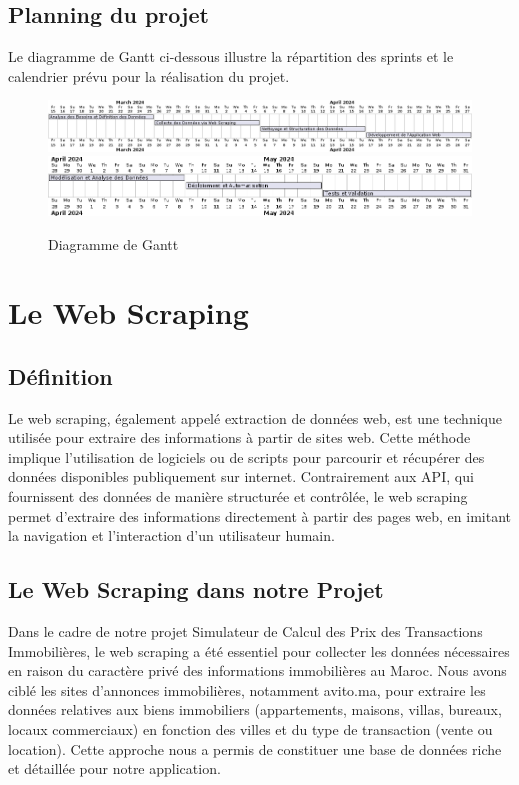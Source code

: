 \documentclass[a4paper,12pt]{report}
\numberwithin{equation}{section}
\begin{document}
\section{Planning du projet}
\vspace{0.5cm}
{\large
\par Le diagramme de Gantt ci-dessous illustre la répartition des sprints et le calendrier prévu pour la réalisation du projet.
}
\vspace{0.5cm}
\begin{figure}[h]
    \centering
        \includegraphics[width=\textwidth]{gantt1.png}
        \includegraphics[width=\textwidth]{gantt2.png}
    \caption{Diagramme de Gantt}
\end{figure}



\newpage
\chapter{Le Web Scraping}
\section{Définition}
\vspace{0.5cm}
\large{
\par Le web scraping, également appelé extraction de données web, est une technique utilisée pour extraire des informations à partir de sites web. Cette méthode implique l'utilisation de logiciels ou de scripts pour parcourir et récupérer des données disponibles publiquement sur internet. Contrairement aux API, qui fournissent des données de manière structurée et contrôlée, le web scraping permet d'extraire des informations directement à partir des pages web, en imitant la navigation et l'interaction d'un utilisateur humain.\par
}
\section{Le Web Scraping dans notre Projet}
\vspace{0.5cm}
\large{
\par Dans le cadre de notre projet Simulateur de Calcul des Prix des Transactions Immobilières, le web scraping a été essentiel pour collecter les données nécessaires en raison du caractère privé des informations immobilières au Maroc. Nous avons ciblé les sites d'annonces immobilières, notamment avito.ma, pour extraire les données relatives aux biens immobiliers (appartements, maisons, villas, bureaux, locaux commerciaux) en fonction des villes et du type de transaction (vente ou location). Cette approche nous a permis de constituer une base de données riche et détaillée pour notre application.\par
}
\end{document}
